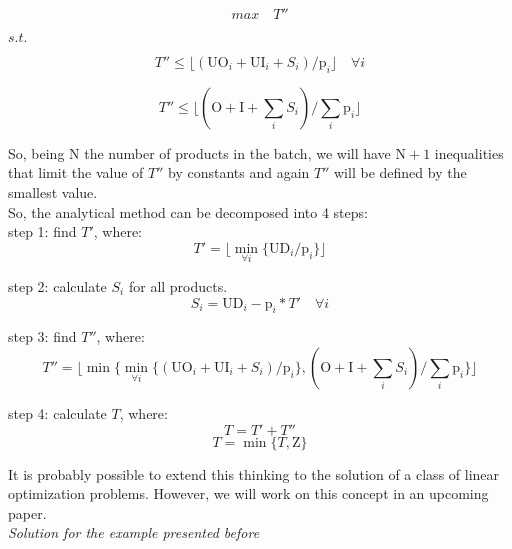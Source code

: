\documentclass[authoryear,preprint,12pt]{elsarticle}
\begin{document}
\begin{equation}
max \quad T''
\end{equation}

$s.t.$

\begin{equation}
T'' \leq \lfloor{(\textrm{UO}_i + \textrm{UI}_i + S_i) / \textrm{p}_i}\rfloor  \quad \forall i
\end{equation}

\begin{equation}
T'' \leq \lfloor{(\textrm{O} + \textrm{I} + \sum_i {S_i}) / \sum_i {\textrm{p}_i}}\rfloor
\end{equation}

So, being $\textrm{N}$ the number of products in the batch, we will have $\textrm{N}+1$ inequalities that limit the value of $T''$ by constants and again $T''$ will be defined by the smallest value. \\

So, the analytical method can be decomposed into 4 steps: \\

step 1: find $T'$, where:
\begin{equation}
T' = \lfloor{\min_{\forall i} \{\textrm{UD}_i / \textrm{p}_i\}}\rfloor
\end{equation}

step 2: calculate $S_i$ for all products.
\begin{equation}
\label{eq:unmet}
S_i = \textrm{UD}_i - \textrm{p}_i * T' \quad \forall i
\end{equation}

step 3: find $T''$, where:
\begin{equation}
T'' = \lfloor{\min \{\min_{\forall i} \{(\textrm{UO}_i + \textrm{UI}_i + S_i) / \textrm{p}_i\},(\textrm{O} + \textrm{I} + \sum_i {S_i}) / \sum_i {\textrm{p}_i}\}}\rfloor
\end{equation}

step 4: calculate $T$, where: 
\begin{equation}
T = T' + T''
\end{equation}
\begin{equation}
T = \min \{T , \textrm{Z}\}
\end{equation}

It is probably possible to extend this thinking to the solution of a class of linear optimization problems. However, we will work on this concept in an upcoming paper. \\

\emph{Solution for the example presented before} \\
\end{document}
